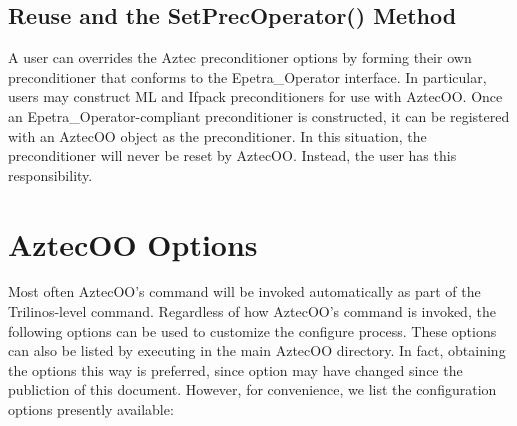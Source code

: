 \documentclass[12pt,relax]{AztecOOUserGuide}
\renewcommand{\vector}{Epetra\_Vector}
\newcommand{\distobject}{Epetra\_DistObject}
\newcommand{\operator}{Epetra\_Operator}
\begin{document}
\subsection{Reuse and the SetPrecOperator() Method}

A user can overrides the Aztec preconditioner options by
forming their own preconditioner that conforms to the \operator{}
interface.  In particular, users may construct ML and Ifpack
preconditioners for use with AztecOO.  Once an \operator{}-compliant
preconditioner is constructed, it can be registered with an AztecOO
object as the preconditioner.  In this situation, the preconditioner
will never be reset by AztecOO.  Instead, the user has this responsibility.

\clearpage

%


\appendix
\section{AztecOO  Options}

Most often AztecOO's  command will be invoked automatically as
part of the Trilinos-level  command.  Regardless of how 
AztecOO's  command is invoked, the following options can be 
used to customize the configure process.  These options can also be listed  by executing
in the main AztecOO directory.  In fact, obtaining the options this way is preferred, since
option may have changed since the publiction of this document.  However, for convenience, we
list the configuration options presently available:


\end{document}
